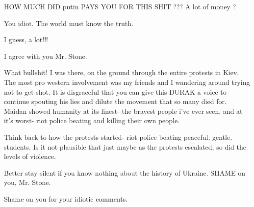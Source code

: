\begin{itemize}

HOW MUCH DID putin PAYS YOU FOR THIS SHIT ??? A lot of money ?

\begin{itemize} %
You idiot. The world must know the truth.

I guess, a lot!!!
\end{itemize} %

I agree with you Mr. Stone.


What bullshit! I was there, on the ground through the entire protests in Kiev.
The most pro western involvement was my friends and I wandering around trying
not to get shot. It is disgraceful that you can give this DURAK a voice to
continue spouting his lies and dilute the movement that so many died for.
Maidan showed humanity at its finest- the bravest people i've ever seen, and at
it's worst- riot police beating and killing their own people.

Think back to how the protests started- riot police beating peaceful, gentle,
students. Is it not plausible that just maybe as the protests escalated, so did
the levels of violence.


Better stay silent if you know nothing about the history of Ukraine. SHAME on you, Mr. Stone.

Shame on you for your idiotic comments.




\end{itemize} %
